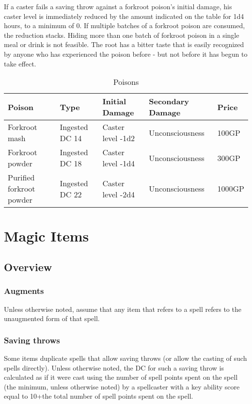 If a caster fails a saving throw against a forkroot poison's initial damage, his caster level is immediately reduced by the amount indicated on the  table for 1d4 hours, to a minimum of 0. 
If multiple batches of a forkroot poison are consumed, the reduction stacks.
Hiding more than one batch of forkroot poison in a single meal or drink is not feasible.
The root has a bitter taste that is easily recognized by anyone who has experienced the poison before - but not before it has begun to take effect.
\begin{table*}
\label{tab:Poisons}
\caption{Poisons}
\centering
\begin{tabular}{|l|l|l|l|l|}
\hline
\textbf{Poison}		&\textbf{Type}	&\textbf{Initial Damage}&\textbf{Secondary Damage}	&\textbf{Price}\\
\hline
Forkroot mash		&Ingested DC 14	&Caster level -1d2	&Unconsciousness		&100GP\\
Forkroot powder		&Ingested DC 18	&Caster level -1d4	&Unconsciousness		&300GP\\
Purified forkroot powder&Ingested DC 22	&Caster level -2d4	&Unconsciousness		&1000GP\\
\hline
\end{tabular}

\end{table*}
\section{Magic Items}
\subsection{Overview}
\subsubsection{Augments}
Unless otherwise noted, assume that any item that refers to a spell refers to the unaugmented form of that spell.
\subsubsection{Saving throws}
Some items duplicate spells that allow saving throws (or allow the casting of such spells directly). Unless otherwise noted, the DC for such a saving throw is calculated as if it were cast using the number of spell points spent on the spell (the minimum, unless otherwise noted) by a spellcaster with a key ability score equal to 10+the total number of spell points spent on the spell.

